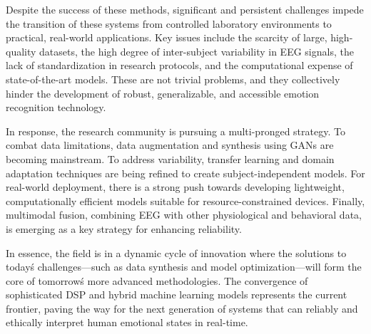 \documentclass[conference]{IEEEtran}
\begin{document}
Despite the success of these methods, significant and persistent challenges impede the transition of these systems from controlled laboratory environments to practical, real-world applications. Key issues include the scarcity of large, high-quality datasets, the high degree of inter-subject variability in EEG signals, the lack of standardization in research protocols, and the computational expense of state-of-the-art models. These are not trivial problems, and they collectively hinder the development of robust, generalizable, and accessible emotion recognition technology.

In response, the research community is pursuing a multi-pronged strategy. To combat data limitations, data augmentation and synthesis using GANs are becoming mainstream. To address variability, transfer learning and domain adaptation techniques are being refined to create subject-independent models. For real-world deployment, there is a strong push towards developing lightweight, computationally efficient models suitable for resource-constrained devices. Finally, multimodal fusion, combining EEG with other physiological and behavioral data, is emerging as a key strategy for enhancing reliability.

In essence, the field is in a dynamic cycle of innovation where the solutions to today\'s challenges—such as data synthesis and model optimization—will form the core of tomorrow\'s more advanced methodologies. The convergence of sophisticated DSP and hybrid machine learning models represents the current frontier, paving the way for the next generation of systems that can reliably and ethically interpret human emotional states in real-time.




\end{document}
